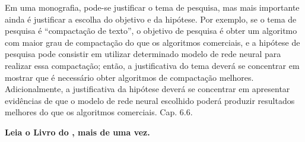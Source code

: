\documentclass[a4paper,12pt]{article}
\begin{document}
Em uma monografia, pode-se justificar o tema de pesquisa, mas mais importante ainda é justificar a escolha do objetivo e da hipótese. Por exemplo, se o tema de pesquisa é “compactação de texto”, o objetivo de pesquisa é obter um algoritmo com maior grau de compactação do que os algoritmos comerciais, e a hipótese de pesquisa pode consistir em utilizar determinado modelo de rede neural para realizar essa compactação; então, a justificativa do tema deverá se concentrar em mostrar que é necessário obter algoritmos de compactação melhores. Adicionalmente, a justificativa da hipótese deverá se concentrar em apresentar evidências de que o modelo de rede neural escolhido poderá produzir resultados melhores do que os algoritmos comerciais. \cite{wazlawick2017metodologia} Cap. 6.6. 

\textbf{Leia o Livro do \cite{wazlawick2017metodologia}, mais de uma vez.}


%

\end{document}

